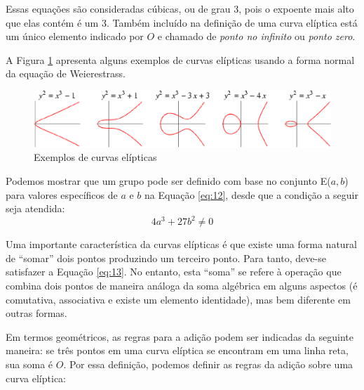 Essas equações são consideradas cúbicas, ou de grau 3, pois o expoente mais alto que elas contém é um 3. Também incluído na definição de uma curva elíptica está um único elemento indicado por \(O\) e chamado de \textit{ponto no infinito} ou \textit{ponto zero}.

A Figura \ref{fig:curvas} apresenta alguns exemplos de curvas elípticas usando a forma normal da equação de Weierestrass.

\begin{figure}[h]
\centering
\includegraphics[scale=0.5, bb=0 0 529 101]{figuras/curvas.eps}
\caption{Exemplos de curvas elípticas}
\label{fig:curvas}
\end{figure}


Podemos mostrar que um grupo pode ser definido com base no conjunto E(\(a, b\)) para valores específicos de \(a\) e \(b\) na Equação \ref{eq:12}, desde que a condição a seguir seja atendida:
\begin{equation}
4a^3 + 27b^2 \neq 0 \label{eq:13}
\end{equation}

Uma importante característica da curvas elípticas é que existe uma forma natural de ``somar'' dois pontos produzindo um terceiro ponto. Para tanto, deve-se satisfazer a Equação \ref{eq:13}. No entanto, esta ``soma'' se refere à operação que combina dois pontos de maneira análoga da soma algébrica em alguns aspectos (é comutativa, associativa e existe um elemento identidade), mas bem diferente em outras formas.

Em termos geométricos, as regras para a adição podem ser indicadas da seguinte maneira: se três pontos em uma curva elíptica se encontram em uma linha reta, sua soma é $O$. Por essa definição, podemos definir as regras da adição sobre uma curva elíptica:

